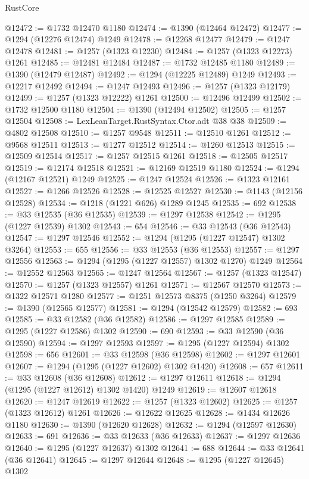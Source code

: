 \begin{lexlean}{RustCore}
\begin{coremodule}
@12472 := @1732 @12470 @1180
@12474 := @1390 (@12464 @12472)
@12477 := @1294 (@12276 @12474) @1249
@12478 := @12268 @12477
@12479 := @1247 @12478
@12481 := @1257 (@1323 @12230)
@12484 := @1257 (@1323 @12273) @1261
@12485 := @12481 @12484
@12487 := @1732 @12485 @1180
@12489 := @1390 (@12479 @12487)
@12492 := @1294 (@12225 @12489) @1249
@12493 := @12217 @12492
@12494 := @1247 @12493
@12496 := @1257 (@1323 @12179)
@12499 := @1257 (@1323 @12222) @1261
@12500 := @12496 @12499
@12502 := @1732 @12500 @1180
@12504 := @1390 (@12494 @12502)
@12505 := @1257 @12504
@12508 := LexLeanTarget.RustSyntax.Ctor.adt @38 @38
@12509 := @4802 @12508
@12510 := @1257 @9548
@12511 := @12510 @1261
@12512 := @9568 @12511
@12513 := @1277 @12512
@12514 := @1260 @12513
@12515 := @12509 @12514
@12517 := @1257 @12515 @1261
@12518 := @12505 @12517
@12519 := @12174 @12518
@12521 := @12169 @12519 @1180
@12524 := @1294 (@12167 @12521) @1249
@12525 := @1247 @12524
@12526 := @1323 @12161
@12527 := @1266 @12526
@12528 := @12525 @12527
@12530 := @1143 (@12156 @12528)
@12534 := @1218 (@1221 @626) @1289 @1245
@12535 := 692
@12538 := @33 @12535 (@36 @12535)
@12539 := @1297 @12538
@12542 := @1295 (@1227 @12539) @1302
@12543 := 654
@12546 := @33 @12543 (@36 @12543)
@12547 := @1297 @12546
@12552 := @1294 (@1295 (@1227 @12547) @1302 @3264)
@12553 := 655
@12556 := @33 @12553 (@36 @12553)
@12557 := @1297 @12556
@12563 := @1294 (@1295 (@1227 @12557) @1302 @1270) @1249
@12564 := @12552 @12563
@12565 := @1247 @12564
@12567 := @1257 (@1323 @12547)
@12570 := @1257 (@1323 @12557) @1261
@12571 := @12567 @12570
@12573 := @1322 @12571 @1280
@12577 := @1251 @12573 @8375 (@1250 @3264)
@12579 := @1390 (@12565 @12577)
@12581 := @1294 (@12542 @12579)
@12582 := 693
@12585 := @33 @12582 (@36 @12582)
@12586 := @1297 @12585
@12589 := @1295 (@1227 @12586) @1302
@12590 := 690
@12593 := @33 @12590 (@36 @12590)
@12594 := @1297 @12593
@12597 := @1295 (@1227 @12594) @1302
@12598 := 656
@12601 := @33 @12598 (@36 @12598)
@12602 := @1297 @12601
@12607 := @1294 (@1295 (@1227 @12602) @1302 @1420)
@12608 := 657
@12611 := @33 @12608 (@36 @12608)
@12612 := @1297 @12611
@12618 := @1294 (@1295 (@1227 @12612) @1302 @1420) @1249
@12619 := @12607 @12618
@12620 := @1247 @12619
@12622 := @1257 (@1323 @12602)
@12625 := @1257 (@1323 @12612) @1261
@12626 := @12622 @12625
@12628 := @1434 @12626 @1180
@12630 := @1390 (@12620 @12628)
@12632 := @1294 (@12597 @12630)
@12633 := 691
@12636 := @33 @12633 (@36 @12633)
@12637 := @1297 @12636
@12640 := @1295 (@1227 @12637) @1302
@12641 := 688
@12644 := @33 @12641 (@36 @12641)
@12645 := @1297 @12644
@12648 := @1295 (@1227 @12645) @1302

\end{coremodule}
\end{lexlean}

